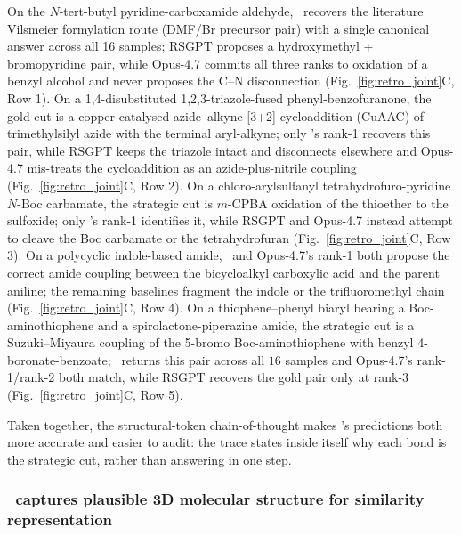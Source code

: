  
 
 

 
 

 
 

 
 

 
 
 

On the $N$-tert-butyl pyridine-carboxamide aldehyde, \projName~recovers the literature Vilsmeier formylation route (DMF/Br precursor pair) with a single canonical answer across all 16 samples; RSGPT proposes a hydroxymethyl + bromopyridine pair, while Opus-4.7 commits all three ranks to oxidation of a benzyl alcohol and never proposes the C--N disconnection (Fig.~\ref{fig:retro_joint}C, Row 1). On a 1,4-disubstituted 1,2,3-triazole-fused phenyl-benzofuranone, the gold cut is a copper-catalysed azide--alkyne [3+2] cycloaddition (CuAAC) of trimethylsilyl azide with the terminal aryl-alkyne; only \projName's rank-1 recovers this pair, while RSGPT keeps the triazole intact and disconnects elsewhere and Opus-4.7 mis-treats the cycloaddition as an azide-plus-nitrile coupling (Fig.~\ref{fig:retro_joint}C, Row 2). On a chloro-arylsulfanyl tetrahydrofuro-pyridine $N$-Boc carbamate, the strategic cut is $m$-CPBA oxidation of the thioether to the sulfoxide; only \projName's rank-1 identifies it, while RSGPT and Opus-4.7 instead attempt to cleave the Boc carbamate or the tetrahydrofuran (Fig.~\ref{fig:retro_joint}C, Row 3). On a polycyclic indole-based amide, \projName~and Opus-4.7's rank-1 both propose the correct amide coupling between the bicycloalkyl carboxylic acid and the parent aniline; the remaining baselines fragment the indole or the trifluoromethyl chain (Fig.~\ref{fig:retro_joint}C, Row 4). On a thiophene--phenyl biaryl bearing a Boc-aminothiophene and a spirolactone-piperazine amide, the strategic cut is a Suzuki--Miyaura coupling of the 5-bromo Boc-aminothiophene with benzyl 4-boronate-benzoate; \projName~returns this pair across all $16$ samples and Opus-4.7's rank-1/rank-2 both match, while RSGPT recovers the gold pair only at rank-3 (Fig.~\ref{fig:retro_joint}C, Row 5).

Taken together, the structural-token chain-of-thought makes \projName's predictions both more accurate and easier to audit: the trace states inside itself why each bond is the strategic cut, rather than answering in one step. 

\subsubsection{\projName~captures plausible 3D molecular structure for similarity representation}

